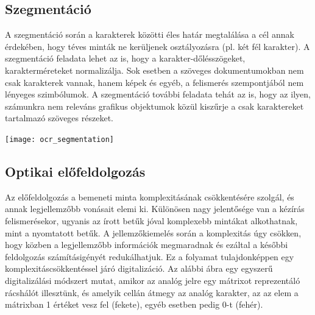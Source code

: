 \subsection{Szegmentáció}

A szegmentáció során a karakterek közötti éles határ megtalálása a cél annak érdekében, hogy téves minták ne kerüljenek osztályozásra (pl. két fél karakter). A szegmentáció feladata lehet az is, hogy a karakter-dőlésszögeket, karakterméreteket normalizálja. Sok esetben a szöveges dokumentumokban nem csak karakterek vannak, hanem képek és egyéb, a felismerés szempontjából nem lényeges szimbólumok. A szegmentáció további feladata tehát az is, hogy az ilyen, számunkra nem releváns grafikus objektumok közül kiszűrje a csak karaktereket tartalmazó szöveges részeket.

\begin{center}
\texttt{[image: ocr\_segmentation]}
\end{center}

\subsection{Optikai előfeldolgozás}

Az előfeldolgozás a bemeneti minta komplexitásának csökkentésére szolgál, és annak legjellemzőbb vonásait elemi ki. Különösen nagy jelentősége van a kézírás felismerésekor, ugyanis az írott betűk jóval komplexebb mintákat alkothatnak, mint a nyomtatott betűk. A jellemzőkiemelés során a komplexitás úgy csökken, hogy közben a legjellemzőbb információk megmaradnak és ezáltal a későbbi feldolgozás számításigényét redukálhatjuk. Ez a folyamat tulajdonképpen egy komplexitáscsökkentéssel járó digitalizáció. Az alábbi ábra egy egyszerű digitalizálási módszert mutat, amikor az analóg jelre egy mátrixot reprezentáló rácshálót illesztünk, és amelyik cellán átmegy az analóg karakter, az az elem a mátrixban 1 értéket vesz fel (fekete), egyéb esetben pedig 0-t (fehér).

